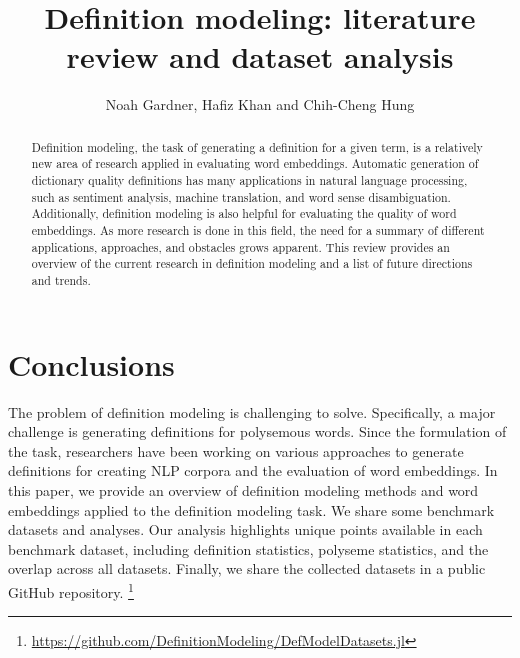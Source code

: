 \documentclass{aci}
\numberwithin{equation}{section}
\begin{document}
\title{Definition modeling: literature review and dataset analysis}

\author{%
    Noah Gardner,
    Hafiz Khan 
    and Chih-Cheng Hung\corrauth
}%


\address{%
    }


\begin{abstract}
    Definition modeling, the task of generating a definition for a given term, is a relatively new area of research applied in evaluating word embeddings. Automatic generation of dictionary quality definitions has many applications in natural language processing, such as sentiment analysis, machine translation, and word sense disambiguation. Additionally, definition modeling is also helpful for evaluating the quality of word embeddings. As more research is done in this field, the need for a summary of different applications, approaches, and obstacles grows apparent. This review provides an overview of the current research in definition modeling and a list of future directions and trends.
\end{abstract}
\maketitle





\FloatBarrier


\FloatBarrier
\section{Conclusions}
The problem of definition modeling is challenging to solve. Specifically, a major challenge is generating definitions for polysemous words. Since the formulation of the task, researchers have been working on various approaches to generate definitions for creating NLP corpora and the evaluation of word embeddings. In this paper, we provide an overview of definition modeling methods and word embeddings applied to the definition modeling task. We share some benchmark datasets and analyses. Our analysis highlights unique points available in each benchmark dataset, including definition statistics, polyseme statistics, and the overlap across all datasets. Finally, we share the collected datasets in a public GitHub repository. \footnote{
\href{https://github.com/DefinitionModeling/DefModelDatasets.jl}
{https://github.com/DefinitionModeling/DefModelDatasets.jl}
}
\end{document}
